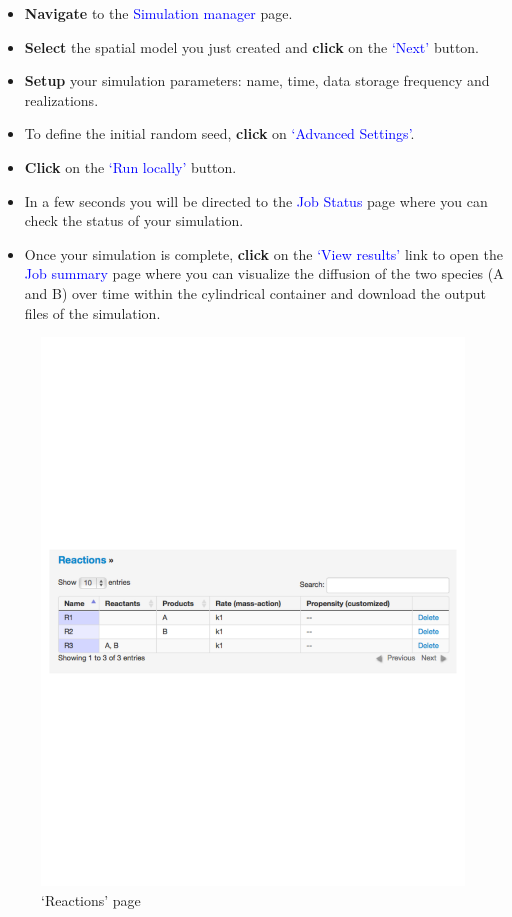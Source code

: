 \begin{itemize}
\item \textbf{Navigate} to the \textcolor{blue}{Simulation manager} page.

\item \textbf{Select} the spatial model you just created and \textbf{click} on the \textcolor{blue}{`Next'} button.
\item \textbf{Setup} your simulation parameters: name, time, data storage frequency and realizations. 
\item To define the initial random seed, \textbf{click} on \textcolor{blue}{`Advanced Settings'}.
\item \textbf{Click} on the \textcolor{blue}{`Run locally'} button.
\item In a few seconds you will be directed to the \textcolor{blue}{Job Status} page where you can check the status of your simulation.
\item Once your simulation is complete, \textbf{click} on the \textcolor{blue}{`View results'} link to open the \textcolor{blue}{Job summary} page where you can visualize the diffusion of the two species (A and B) over time within the cylindrical container and download the output files of the simulation.

\end{itemize}

\begin{figure}[!ht]
\centering
\includegraphics[scale=0.64]{T4/reactions-spatial.pdf}
\caption{`Reactions' page}
\label{fig:2}
\end{figure}


